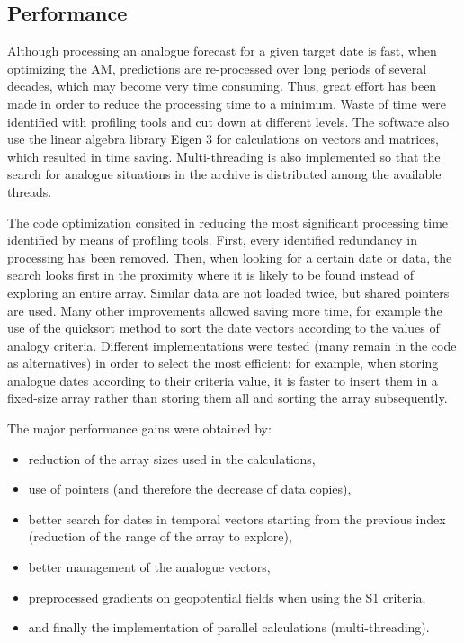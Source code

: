\documentclass[review]{elsarticle}
\begin{document}
\subsection{Performance}

Although processing an analogue forecast for a given target date is fast, when optimizing the AM, predictions are re-processed over long periods of several decades, which may become very time consuming. Thus, great effort has been made in order to reduce the processing time to a minimum. Waste of time were identified with profiling tools and cut down at different levels. The software also use the linear algebra library Eigen 3 \citep{Guennebaud2010} for calculations on vectors and matrices, which resulted in time saving. Multi-threading is also implemented so that the search for analogue situations in the archive is distributed among the available threads.

The code optimization consited in reducing the most significant processing time identified by means of profiling tools. First, every identified redundancy in processing has been removed. Then, when looking for a certain date or data, the search looks first in the proximity where it is likely to be found instead of exploring an entire array. Similar data are not loaded twice, but shared pointers are used. Many other improvements allowed saving more time, for example the use of the quicksort method \citep{Hoare1962a} to sort the date vectors according to the values of analogy criteria. Different implementations were tested (many remain in the code as alternatives) in order to select the most efficient: for example, when storing analogue dates according to their criteria value, it is faster to insert them in a fixed-size array rather than storing them all and sorting the array subsequently.

The major performance gains were obtained by:
\vspace*{-2mm}
\begin{itemize}
	\setlength\itemsep{-2px}
	\item reduction of the array sizes used in the calculations,
	\item use of pointers (and therefore the decrease of data copies),
	\item better search for dates in temporal vectors starting from the previous index (reduction of the range of the array to explore),
	\item better management of the analogue vectors,
	\item preprocessed gradients on geopotential fields when using the S1 criteria,
	\item and finally the implementation of parallel calculations (multi-threading).
\end{itemize}
\end{document}
